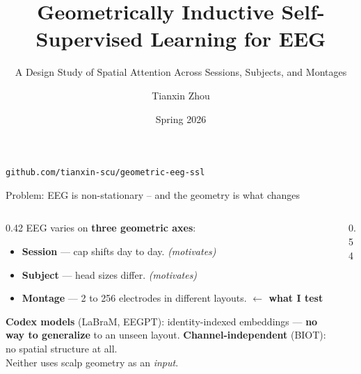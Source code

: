 \documentclass[aspectratio=169]{beamer}
\title{Geometrically Inductive Self-Supervised Learning for EEG}
\subtitle{A Design Study of Spatial Attention Across Sessions, Subjects, and Montages}
\author{Tianxin Zhou}
\institute{ECEN 525 -- Brain--Computer Interaction \\ Santa Clara University}
\date{Spring 2026}
\begin{document}
\begin{frame}[plain]
  \titlepage
  \vfill
  \centering
  \footnotesize
  \texttt{github.com/tianxin-scu/geometric-eeg-ssl}
\end{frame}

\begin{frame}{Problem: EEG is non-stationary -- and the geometry is what changes}
  \vspace{-0.4em}
  \begin{columns}[T]
    \begin{column}{0.42\textwidth}
      \small
      EEG varies on \textbf{three geometric axes}:
      \begin{itemize}
        \setlength{\itemsep}{2pt}
        \item \textbf{Session} — cap shifts day to day. \emph{(motivates)}
        \item \textbf{Subject} — head sizes differ. \emph{(motivates)}
        \item \textbf{Montage} — 2 to 256 electrodes in different layouts. \textbf{$\leftarrow$ what I test}
      \end{itemize}
      \vspace{0.4em}
      \footnotesize
      \textcolor{codexcolor}{\textbf{Codex models}} (LaBraM, EEGPT):
      identity-indexed embeddings --- \textbf{no way to generalize} to an unseen layout.
      \textcolor{chindcolor}{\textbf{Channel-independent}} (BIOT):
      no spatial structure at all.
      \\[0.3em]
      Neither uses scalp geometry as an \emph{input}.
    \end{column}
    \begin{column}{0.54\textwidth}
      \centering


\end{column}
\end{columns}
\end{frame}
\end{document}
